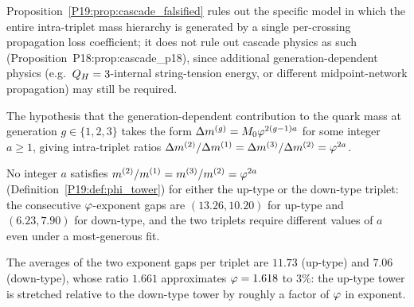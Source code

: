 \begin{remark}
\label{P19:rem:cascade_scope}
Proposition~\ref{P19:prop:cascade_falsified} rules out the specific
model in which the entire intra-triplet mass hierarchy is generated by
a single per-crossing propagation loss coefficient; it does not rule
out cascade physics as such (Proposition~P18:prop:cascade\_p18), since
additional generation-dependent physics (e.g.\ $Q_H=3$-internal
string-tension energy, or different midpoint-network propagation) may
still be required.
\end{remark}


\begin{definition}
\label{P19:def:phi_tower}
The hypothesis that the generation-dependent contribution to the
quark mass at generation $g\in\{1,2,3\}$ takes the form
$\Delta m^{(g)}=M_0\varphi^{2(g-1)a}$ for some integer $a\ge1$, giving
intra-triplet ratios $\Delta m^{(2)}/\Delta m^{(1)}=
\Delta m^{(3)}/\Delta m^{(2)}=\varphi^{2a}$.
\end{definition}

\begin{proposition}
\label{P19:prop:phi_tower_falsified}
No integer $a$ satisfies $m^{(2)}/m^{(1)}=m^{(3)}/m^{(2)}=\varphi^{2a}$
(Definition~\ref{P19:def:phi_tower}) for either the up-type or the
down-type triplet: the consecutive $\varphi$-exponent gaps are
$(13.26,10.20)$ for up-type and $(6.23,7.90)$ for down-type, and the
two triplets require different values of $a$ even under a
most-generous fit.
\end{proposition}

\begin{remark}
\label{P19:rem:tower_structure}
The averages of the two exponent gaps per triplet are $11.73$
(up-type) and $7.06$ (down-type), whose ratio $1.661$ approximates
$\varphi=1.618$ to $3\%$: the up-type tower is stretched relative to the
down-type tower by roughly a factor of $\varphi$ in exponent.
\end{remark}

